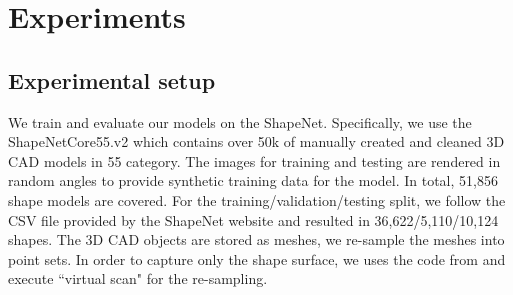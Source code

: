 \section{Experiments}
\subsection{Experimental setup}
We train and evaluate our models on the ShapeNet\cite{shapenetdata}. Specifically, we use the ShapeNetCore55.v2 which contains over 50k of
manually created and cleaned 3D CAD models in 55 category.
The images for training
and testing are rendered in random angles to provide synthetic training data for the model. In total,
51,856 shape models are covered. For the training/validation/testing split, we follow the CSV file provided by the ShapeNet website and resulted in 36,622/5,110/10,124 shapes. The 3D CAD objects are
stored as meshes, we re-sample the meshes into point sets. In order to capture only the shape surface, we uses the code from \cite{Wang-2017-OCNN} and execute ``virtual scan" for the re-sampling.
